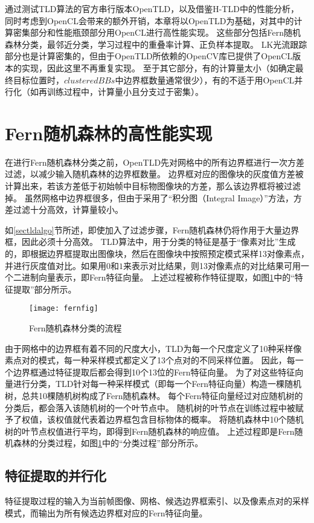 通过测试TLD算法的官方串行版本OpenTLD，以及借鉴H-TLD中的性能分析，
同时考虑到OpenCL会带来的额外开销，本章将以OpenTLD为基础，对其中的计算密集部分和性能瓶颈部分用OpenCL进行高性能实现。
这些部分包括Fern随机森林分类，最邻近分类，学习过程中的重叠率计算、正负样本提取。
LK光流跟踪部分也是计算密集的，但由于OpenTLD所依赖的OpenCV库已提供了OpenCL版本的实现，因此这里不再重复实现。
至于其它部分，有的计算量太小（如确定最终目标位置时，$clusteredBBs$中边界框数量通常很少），有的不适于用OpenCL并行化（如再训练过程中，计算量小且分支过于密集）。

\section{Fern随机森林的高性能实现}
在进行Fern随机森林分类之前，OpenTLD先对网格中的所有边界框进行一次方差过滤，以减少输入随机森林的边界框数量。
边界框对应的图像块的灰度值方差被计算出来，若该方差低于初始帧中目标物图像块的方差，那么该边界框将被过滤掉。
虽然网格中边界框很多，但由于采用了``积分图（Integral Image）''方法，方差过滤十分高效，计算量较小。

如\ref{sectldalgo}节所述，即使加入了过滤步骤，Fern随机森林仍将作用于大量边界框，因此必须十分高效。
TLD算法中，用于分类的特征是基于``像素对比''生成的，即根据边界框提取出图像块，然后在图像块中按照预定模式采样13对像素点，并进行灰度值对比。如果用$0$和$1$来表示对比结果，则13对像素点的对比结果可用一个二进制向量表示，即Fern特征向量。
上述过程被称作特征提取，如图\ref{fernfig}中的``特征提取''部分所示。

\begin{figure}[htb]
  \centering
  \texttt{[image: fernfig]}
  \caption{Fern随机森林分类的流程}
  \label{fernfig}
\end{figure}

由于网格中的边界框有着不同的尺度大小，TLD为每一个尺度定义了10种采样像素点对的模式，每一种采样模式都定义了13个点对的不同采样位置。
因此，每一个边界框通过特征提取后都会得到10个13位的Fern特征向量。
为了对这些特征向量进行分类，TLD针对每一种采样模式（即每一个Fern特征向量）构造一棵随机树，总共10棵随机树构成了Fern随机森林。
每个Fern特征向量经过对应随机树的分类后，都会落入该随机树的一个叶节点中。
随机树的叶节点在训练过程中被赋予了权值，该权值就代表着边界框包含目标物体的概率。
将随机森林中10个随机树的叶节点权值进行平均，即得到Fern随机森林的响应值。
上述过程即是Fern随机森林的分类过程，如图\ref{fernfig}中的``分类过程''部分所示。

\subsection{特征提取的并行化}
\label{featureextsec}
特征提取过程的输入为当前帧图像、网格、候选边界框索引、以及像素点对的采样模式，而输出为所有候选边界框对应的Fern特征向量。

